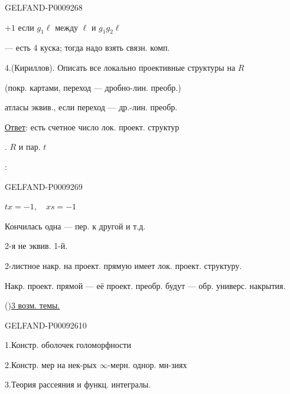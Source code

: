 \begin{GelfandAdjacentEvidence}{GELFAND-P000926}{8}


$+1$ если $g_1\ell$ между $\ell$ и $g_1g_2\ell$

 --- есть 4 куска; тогда надо взять связн. комп.

4.\enspace (Кириллов). Описать все локально проективные структуры на $R$

(покр. картами, переход --- дробно-лин. преобр.)

атласы эквив., если переход --- др.-лин. преобр.

\underline{Ответ}: есть счетное число лок. проект. структур

. $R$ и пар. $t$

:
\end{GelfandAdjacentEvidence}
\begin{GelfandAdjacentEvidence}{GELFAND-P000926}{9}


 $tx=-1,\quad xs=-1$

Кончилась одна --- пер. к другой и т.д.

2-я не эквив. 1-й.

2-листное накр. на проект. прямую имеет лок. проект. структуру.

Накр. проект. прямой --- её проект. преобр. будут --- обр. универс. накрытия.

 ()\qquad\underline{3 возм. темы.}
\end{GelfandAdjacentEvidence}
\begin{GelfandAdjacentEvidence}{GELFAND-P000926}{10}


1.\enspace Констр. оболочек голоморфности

2.\enspace Констр. мер на нек-рых $\infty$-мерн. однор. мн-зиях

3.\enspace Теория рассеяния и функц. интегралы.
\end{GelfandAdjacentEvidence}
